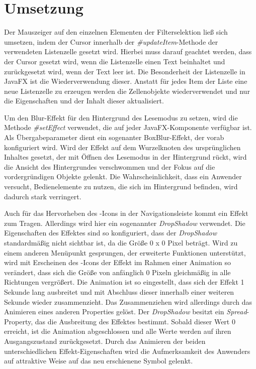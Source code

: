 \section{Umsetzung} \label{sec:optiImplementation}
Der Mauszeiger auf den einzelnen Elementen der Filterselektion ließ sich umsetzen, indem der Cursor innerhalb der \textit{\#{}updateItem}-Methode der verwendeten Listenzelle gesetzt wird. Hierbei muss darauf geachtet werden, dass der Cursor gesetzt wird, wenn die Listenzelle einen Text beinhaltet und zurückgesetzt wird, wenn der Text leer ist. Die Besonderheit der Listenzelle in JavaFX ist die Wiederverwendung dieser. Anstatt für jedes Item der Liste eine neue Listenzelle zu erzeugen werden die Zellenobjekte wiederverwendet und nur die Eigenschaften und der Inhalt dieser aktualisiert.\par
{}
Um den Blur-Effekt für den Hintergrund des Lesemodus zu setzen, wird die Methode \textit{\#{}setEffect} verwendet, die auf jeder JavaFX-Komponente verfügbar ist. Als Übergabeparameter dient ein sogenanter BoxBlur-Effekt, der vorab konfiguriert wird. Wird der Effekt auf dem Wurzelknoten des ursprünglichen Inhaltes gesetzt, der mit Öffnen des Lesemodus in der Hintergrund rückt, wird die Ansicht des Hintergrundes verschwommen und der Fokus auf die vordergründigen Objekte gelenkt. Die Wahrscheinlichkeit, dass ein Anwender versucht, Bedienelemente zu nutzen, die sich im Hintergrund befinden, wird dadurch stark verringert.\par
{}
Auch für das Hervorheben des -Icons in der Navigationsleiste kommt ein Effekt zum Tragen. Allerdings wird hier ein sogenannter \textit{DropShadow} verwendet. Die Eigenschaften des Effektes sind so konfiguriert, dass der \textit{DropShadow} standardmäßig nicht sichtbar ist, da die Größe 0 x 0 Pixel beträgt. Wird zu einem anderen Menüpunkt gesprungen, der erweiterte Funktionen unterstützt, wird mit Erscheinen des -Icons der Effekt im Rahmen einer Animation so verändert, dass sich die Größe von anfänglich 0 Pixeln gleichmäßig in alle Richtungen vergrößert. Die Animation ist so eingestellt, dass sich der Effekt 1 Sekunde lang ausbreitet und mit Abschluss dieser innerhalb einer weiteren Sekunde wieder zusammenzieht. Das Zusammenziehen wird allerdings durch das Animieren eines anderen Properties gelöst. Der \textit{DropShadow} besitzt ein \textit{Spread}- Property, das die Ausbreitung des Effektes bestimmt. Sobald dieser Wert 0 erreicht, ist die Animation abgeschlossen und alle Werte werden auf ihren Ausgangszustand zurückgesetzt. Durch das Animieren der beiden unterschiedlichen Effekt-Eigenschaften wird die Aufmerksamkeit des Anwenders auf attraktive Weise auf das neu erschienene Symbol gelenkt.\par
